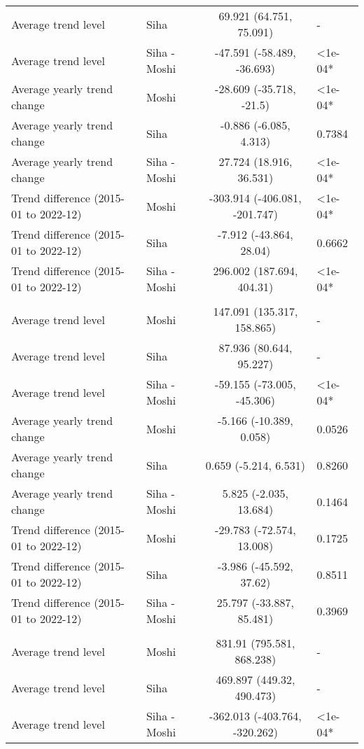 \begin{longtable}{l|lcl}
Average trend level & Siha & 69.921 (64.751, 75.091) & - \\ 
Average trend level & Siha - Moshi & -47.591 (-58.489, -36.693) & <1e-04* \\ 
Average yearly trend change & Moshi & -28.609 (-35.718, -21.5) & <1e-04* \\ 
Average yearly trend change & Siha & -0.886 (-6.085, 4.313) & 0.7384 \\ 
Average yearly trend change & Siha - Moshi & 27.724 (18.916, 36.531) & <1e-04* \\ 
Trend difference (2015-01 to 2022-12) & Moshi & -303.914 (-406.081, -201.747) & <1e-04* \\ 
Trend difference (2015-01 to 2022-12) & Siha & -7.912 (-43.864, 28.04) & 0.6662 \\ 
Trend difference (2015-01 to 2022-12) & Siha - Moshi & 296.002 (187.694, 404.31) & <1e-04* \\ 
\midrule\addlinespace[2.5pt]
\multicolumn{4}{l}{Fractures} \\[2.5pt] 
\midrule\addlinespace[2.5pt]
Average trend level & Moshi & 147.091 (135.317, 158.865) & - \\ 
Average trend level & Siha & 87.936 (80.644, 95.227) & - \\ 
Average trend level & Siha - Moshi & -59.155 (-73.005, -45.306) & <1e-04* \\ 
Average yearly trend change & Moshi & -5.166 (-10.389, 0.058) & 0.0526 \\ 
Average yearly trend change & Siha & 0.659 (-5.214, 6.531) & 0.8260 \\ 
Average yearly trend change & Siha - Moshi & 5.825 (-2.035, 13.684) & 0.1464 \\ 
Trend difference (2015-01 to 2022-12) & Moshi & -29.783 (-72.574, 13.008) & 0.1725 \\ 
Trend difference (2015-01 to 2022-12) & Siha & -3.986 (-45.592, 37.62) & 0.8511 \\ 
Trend difference (2015-01 to 2022-12) & Siha - Moshi & 25.797 (-33.887, 85.481) & 0.3969 \\ 
\midrule\addlinespace[2.5pt]
\multicolumn{4}{l}{Hypertension} \\[2.5pt] 
\midrule\addlinespace[2.5pt]
Average trend level & Moshi & 831.91 (795.581, 868.238) & - \\ 
Average trend level & Siha & 469.897 (449.32, 490.473) & - \\ 
Average trend level & Siha - Moshi & -362.013 (-403.764, -320.262) & <1e-04* \\ 

\end{longtable}
